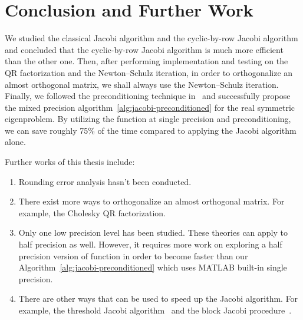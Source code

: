 \chapter{Conclusion and Further Work}

We studied the classical Jacobi algorithm and the cyclic-by-row Jacobi algorithm and concluded that the cyclic-by-row Jacobi algorithm is much more efficient than the other one. Then, after performing implementation and testing on the QR factorization and the Newton--Schulz iteration, in order to orthogonalize an almost orthogonal matrix, we shall always use the Newton--Schulz iteration. Finally, we followed the preconditioning technique in~ and successfully propose the mixed precision algorithm~\ref{alg:jacobi-preconditioned} for the real symmetric eigenproblem. By utilizing the  function at single precision and preconditioning, we can save roughly 75\% of the time compared to applying the Jacobi algorithm alone.

Further works of this thesis include:
\begin{enumerate}
  \item Rounding error analysis hasn't been conducted.
  \item There exist more ways to orthogonalize an almost orthogonal matrix. For example, the Cholesky QR factorization.
  \item Only one low precision level has been studied. These theories can apply to half precision as well. However, it requires more work on exploring a half precision version of  function in order to become faster than our Algorithm~\ref{alg:jacobi-preconditioned} which uses MATLAB built-in single precision. 
  \item There are other ways that can be used to speed up the Jacobi algorithm. For example, the threshold Jacobi algorithm~ and the block Jacobi procedure~.
\end{enumerate}